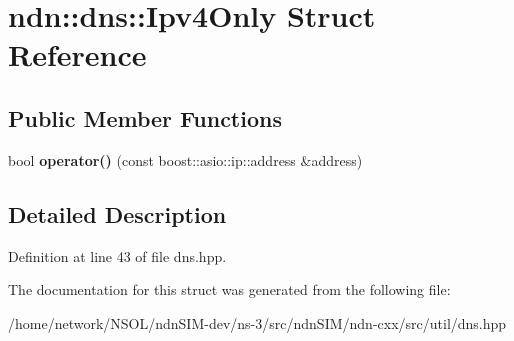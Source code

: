 \hypertarget{structndn_1_1dns_1_1Ipv4Only}{}\section{ndn\+:\+:dns\+:\+:Ipv4\+Only Struct Reference}
\label{structndn_1_1dns_1_1Ipv4Only}
\subsection*{Public Member Functions}
\begin{DoxyCompactItemize}
\item 
bool {\bfseries operator()} (const boost\+::asio\+::ip\+::address \&address)\hypertarget{structndn_1_1dns_1_1Ipv4Only_a290ab9d997d5d4555d177d60339687b8}{}\label{structndn_1_1dns_1_1Ipv4Only_a290ab9d997d5d4555d177d60339687b8}

\end{DoxyCompactItemize}


\subsection{Detailed Description}


Definition at line 43 of file dns.\+hpp.



The documentation for this struct was generated from the following file\+:\begin{DoxyCompactItemize}
\item 
/home/network/\+N\+S\+O\+L/ndn\+S\+I\+M-\/dev/ns-\/3/src/ndn\+S\+I\+M/ndn-\/cxx/src/util/dns.\+hpp\end{DoxyCompactItemize}
